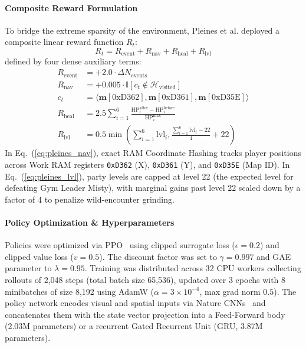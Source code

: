 \documentclass[journal,10pt,twocolumn]{IEEEtran}
\begin{document}
\paragraph{Composite Reward Formulation}
To bridge the extreme sparsity of the environment, Pleines et al. deployed a composite linear reward function $R_t$:
\begin{equation}
R_t = R_{\text{event}} + R_{\text{nav}} + R_{\text{heal}} + R_{\text{lvl}}
\end{equation}
defined by four dense auxiliary terms:
\begin{align}
R_{\text{event}} &= +2.0 \cdot \Delta N_{\text{events}} \\
R_{\text{nav}} &= +0.005 \cdot \mathbb{I}[c_t \notin \mathcal{H}_{\text{visited}}] \label{eq:pleines_nav} \\
c_t &= \langle \mathbf{m}[\text{0xD362}], \mathbf{m}[\text{0xD361}], \mathbf{m}[\text{0xD35E}] \rangle \label{eq:pleines_coords} \\
R_{\text{heal}} &= 2.5 \sum_{i=1}^{6} \frac{\text{HP}_i^{\text{after}} - \text{HP}_i^{\text{before}}}{\text{HP}_i^{\text{max}}} \label{eq:pleines_heal} \\
R_{\text{lvl}} &= 0.5\min\left(\sum_{i=1}^{6} \text{lvl}_i, \frac{\sum_{i=1}^{6} \text{lvl}_i - 22}{4} + 22 \right) \label{eq:pleines_lvl}
\end{align}
In Eq.~(\ref{eq:pleines_nav}), exact RAM Coordinate Hashing tracks player positions across Work RAM registers \texttt{0xD362} (X), \texttt{0xD361} (Y), and \texttt{0xD35E} (Map ID). In Eq.~(\ref{eq:pleines_lvl}), party levels are capped at level 22 (the expected level for defeating Gym Leader Misty), with marginal gains past level 22 scaled down by a factor of 4 to penalize wild-encounter grinding.

\paragraph{Policy Optimization \& Hyperparameters}
Policies were optimized via PPO~\cite{schulman2017ppo} using clipped surrogate loss ($\epsilon = 0.2$) and clipped value loss ($v = 0.5$). The discount factor was set to $\gamma = 0.997$ and GAE parameter to $\lambda = 0.95$. Training was distributed across 32 CPU workers collecting rollouts of 2,048 steps (total batch size 65,536), updated over 3 epochs with 8 minibatches of size 8,192 using AdamW ($\alpha = 3 \times 10^{-4}$, max grad norm $0.5$). The policy network encodes visual and spatial inputs via Nature CNNs~\cite{mnih2015dqn} and concatenates them with the state vector projection into a Feed-Forward body (2.03M parameters) or a recurrent Gated Recurrent Unit (GRU, 3.87M parameters).
\end{document}
